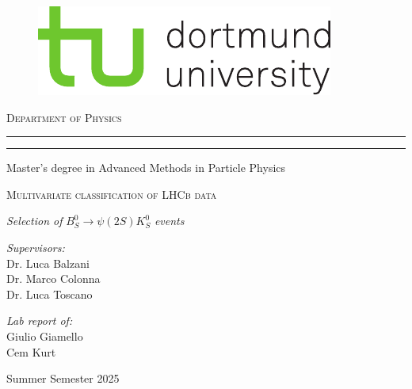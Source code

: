\begin{titlepage}
	
	\begin{figure}[ht]
		\vspace{-0.5cm} %
		\begin{center}
			\includegraphics[scale=1.50]{tud_logos/logo_tud_english.pdf}
		\end{center}
	\end{figure}

    \vspace{15mm} %
	
	\begin{center}
		{{\large{\textsc{Department of Physics}}}}
		\rule[0.1cm]{\linewidth}{0.3mm} %
		\rule[0.5cm]{\linewidth}{0.3mm} %
		Master’s degree in Advanced Methods in Particle Physics
	\end{center}
	
	\vspace{25mm} %
	\begin{center}
		\begin{Large}
			\textsc{Multivariate classification of LHCb data}
		\end{Large}
        
        \vspace{5mm} %
        \textit{Selection of} $B^{0}_{S} \xrightarrow{} \psi(2S)K^{0}_{S}$ \textit{events}
	\end{center}
    
	\vspace{35mm} %
	\noindent
	\begin{minipage}[t]{0.47\textwidth}
		{\large{\textit{Supervisors:}
        \\ Dr. Luca Balzani
        \\ Dr. Marco Colonna
        \\ Dr. Luca Toscano}}
	\end{minipage}
	\hfill
	\begin{minipage}[t]{0.47\textwidth}\raggedleft
		{\large{\textit{Lab report of:}
        \\ Giulio Giamello
        \\Cem Kurt}}
	\end{minipage}
	\vfill
	\vspace{15mm}
	\begin{center}
		{\large{Summer Semester 2025}}
	\end{center}
	\vspace{-2cm}
	
\end{titlepage}

